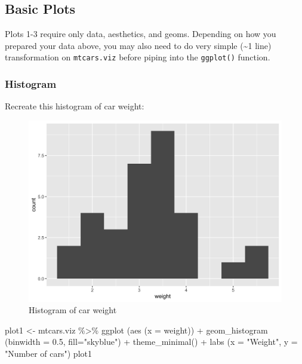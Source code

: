 \documentclass[
  man,
  floatsintext,
  longtable,
  nolmodern,
  notxfonts,
  notimes,
  colorlinks=true,linkcolor=blue,citecolor=blue,urlcolor=blue]{apa7}
\newenvironment{Shaded}{\begin{snugshade}}{\end{snugshade}}
\newcommand{\AttributeTok}[1]{\textcolor[rgb]{0.40,0.45,0.13}{#1}}
\newcommand{\FloatTok}[1]{\textcolor[rgb]{0.68,0.00,0.00}{#1}}
\newcommand{\FunctionTok}[1]{\textcolor[rgb]{0.28,0.35,0.67}{#1}}
\newcommand{\NormalTok}[1]{\textcolor[rgb]{0.00,0.23,0.31}{#1}}
\newcommand{\OtherTok}[1]{\textcolor[rgb]{0.00,0.23,0.31}{#1}}
\newcommand{\SpecialCharTok}[1]{\textcolor[rgb]{0.37,0.37,0.37}{#1}}
\newcommand{\StringTok}[1]{\textcolor[rgb]{0.13,0.47,0.30}{#1}}
\begin{document}
\subsection{Basic Plots}\label{basic-plots}

Plots 1-3 require only data, aesthetics, and geoms. Depending on how you
prepared your data above, you may also need to do very simple
(\textasciitilde1 line) transformation on \texttt{mtcars.viz} before
piping into the \texttt{ggplot()} function.

\subsubsection{Histogram}\label{histogram}

Recreate this histogram of car weight:

\begin{figure}[H]

\caption{Histogram of car weight}

{\centering \includegraphics{plots/plot1.png}

}

\end{figure}%

\begin{Shaded}
\begin{Highlighting}[]
\NormalTok{plot1 }\OtherTok{\textless{}{-}}\NormalTok{ mtcars.viz }\SpecialCharTok{\%\textgreater{}\%}
  \FunctionTok{ggplot}\NormalTok{ (}\FunctionTok{aes}\NormalTok{ (}\AttributeTok{x =}\NormalTok{ weight)) }\SpecialCharTok{+} 
  \FunctionTok{geom\_histogram}\NormalTok{ (}\AttributeTok{binwidth =} \FloatTok{0.5}\NormalTok{, }\AttributeTok{fill=}\StringTok{"skyblue"}\NormalTok{) }\SpecialCharTok{+}
  \FunctionTok{theme\_minimal}\NormalTok{() }\SpecialCharTok{+}
  \FunctionTok{labs}\NormalTok{ (}\AttributeTok{x =} \StringTok{"Weight"}\NormalTok{, }\AttributeTok{y =} \StringTok{"Number of cars"}\NormalTok{) }
\NormalTok{plot1}
\end{Highlighting}
\end{Shaded}
\end{document}
